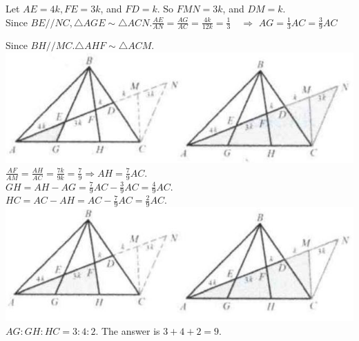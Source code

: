 \documentclass{article}
\begin{document}
Let \(A E=4 k, F E=3 k\), and \(F D=k\). So \(F M N=3 k\), and \(D M=k\).\\
Since \(B E / / N C, \triangle A G E \sim \triangle A C N . \frac{A E}{A N}=\frac{A G}{A C}=\frac{4 k}{12 k}=\frac{1}{3} \quad \Rightarrow\) \(A G=\frac{1}{3} A C=\frac{3}{9} A C\)

Since \(B H / / M C . \triangle A H F \sim \triangle A C M\).\\
\centering
\includegraphics[width=\textwidth]{images/140(3).jpg}\\
\(\frac{A F}{A M}=\frac{A H}{A C}=\frac{7 k}{9 k}=\frac{7}{9} \Rightarrow A H=\frac{7}{9} A C\).\\
\(G H=A H-A G=\frac{7}{9} A C-\frac{3}{9} A C=\frac{4}{9} A C\).\\
\(H C=A C-A H=A C-\frac{7}{9} A C=\frac{2}{9} A C\).\\
\centering
\includegraphics[width=\textwidth]{images/140.jpg}\\
\(A G: G H: H C=3: 4: 2\). The answer is \(3+4+2=9\).
\end{document}
